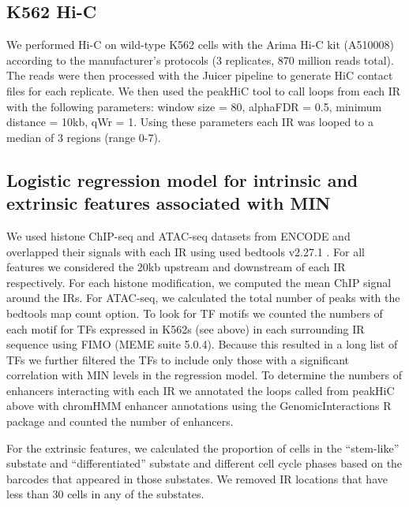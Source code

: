 \subsection*{K562 Hi-C}

We performed Hi-C on wild-type K562 cells with the Arima Hi-C kit (A510008) according to the manufacturer's protocols (3 replicates, 870 million reads total). The reads were then processed with the Juicer pipeline \cite{durandnc_aidenel:JuicerProvides2016} to generate HiC contact files for each replicate. We then used the peakHiC tool \cite{bianchiv_laatw:DetailedRegulatory2019} to call loops from each IR with the following parameters: window size = 80, alphaFDR = 0.5, minimum distance = 10kb, qWr = 1. Using these parameters each IR was looped to a median of 3 regions (range 0-7). 

\subsection*{Logistic regression model for intrinsic and extrinsic features associated with MIN}

We used histone ChIP-seq and ATAC-seq datasets from ENCODE \cite{tencodepc_tencodepc:IntegratedEncyclopedia2012} and overlapped their signals with each IR using used bedtools v2.27.1 \cite{quinlanar_hallim:BEDToolsFlexible2010}. For all features we considered the 20kb upstream and downstream of each IR respectively. For each histone modification, we computed the mean ChIP signal around the IRs. For ATAC-seq, we calculated the total number of peaks with the bedtools map count option. To look for TF motifs we counted the numbers of each motif for TFs expressed in K562s (see above) in each surrounding IR sequence using FIMO \cite{grantce_noblews:FIMOScanning2011} (MEME suite 5.0.4). Because this resulted in a long list of TFs we further filtered the TFs to include only those with a significant correlation with MIN levels in the regression model. To determine the numbers of enhancers interacting with each IR we annotated the loops called from peakHiC above with chromHMM enhancer annotations using the GenomicInteractions R package \cite{harmstonn_lenhardb:GenomicInteractionsBioconductor2015} and counted the number of enhancers. 

For the extrinsic features, we calculated the proportion of cells in the \enquote{stem-like} substate and \enquote{differentiated} substate and different cell cycle phases based on the barcodes that appeared in those substates. We removed IR locations that have less than 30 cells in any of the substates.  

